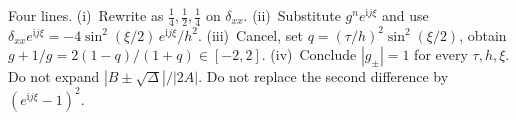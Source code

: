 \begin{examnote}
\label{examnote:p5}
Four lines. (i)~Rewrite as \(\frac14,\frac12,\frac14\) on \(\delta_{xx}\). (ii)~Substitute \(g^n e^{\mathrm i j\xi}\) and use \(\delta_{xx}e^{\mathrm i j\xi}=-4\sin^2(\xi/2)\,e^{\mathrm i j\xi}/h^2\). (iii)~Cancel, set \(q=(\tau/h)^2\sin^2(\xi/2)\), obtain \(g+1/g=2(1-q)/(1+q)\in[-2,2]\). (iv)~Conclude \(|g_\pm|=1\) for every \(\tau,h,\xi\). Do not expand \(|B\pm\sqrt{\Delta}|/|2A|\). Do not replace the second difference by \((e^{\mathrm i j\xi}-1)^2\).
\end{examnote}
